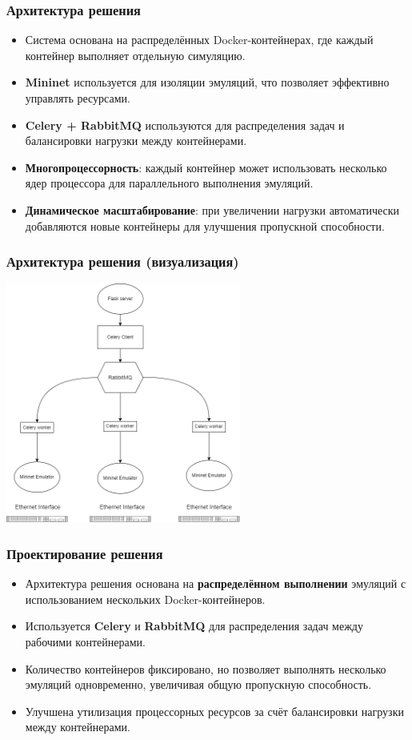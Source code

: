 \documentclass{beamer}
\begin{document}
\begin{frame}[fragile]
  \frametitle{Архитектура решения}
  \begin{itemize}
    \item Система основана на распределённых Docker-контейнерах, где каждый контейнер выполняет отдельную симуляцию.
    \item \textbf{Mininet} используется для изоляции эмуляций, что позволяет эффективно управлять ресурсами.
    \item \textbf{Celery + RabbitMQ} используются для распределения задач и балансировки нагрузки между контейнерами.
    \item \textbf{Многопроцессорность}: каждый контейнер может использовать несколько ядер процессора для параллельного выполнения эмуляций.
    \item \textbf{Динамическое масштабирование}: при увеличении нагрузки автоматически добавляются новые контейнеры для улучшения пропускной способности.
  \end{itemize}
\end{frame}


\begin{frame}[fragile]
  \frametitle{Архитектура решения (визуализация)}
  \begin{center}
    \includegraphics[width=0.58\textwidth]{example.png}
  \end{center}
\end{frame}

\begin{frame}[fragile]
  \frametitle{Проектирование решения}
  \begin{itemize}
    \item Архитектура решения основана на \textbf{распределённом выполнении} эмуляций с использованием нескольких Docker-контейнеров.
    \item Используется \textbf{Celery} и \textbf{RabbitMQ} для распределения задач между рабочими контейнерами.
    \item Количество контейнеров фиксировано, но позволяет выполнять несколько эмуляций одновременно, увеличивая общую пропускную способность.
    \item Улучшена утилизация процессорных ресурсов за счёт балансировки нагрузки между контейнерами.
  \end{itemize}
\end{frame}
\end{document}
